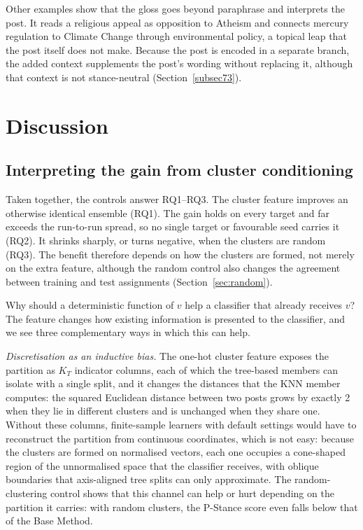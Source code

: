 \documentclass[pdflatex,sn-mathphys-num,iicol]{sn-jnl}%
\begin{document}
Other examples show that the gloss goes beyond paraphrase and interprets the post. It reads a religious appeal as opposition to Atheism and connects mercury regulation to Climate Change through environmental policy, a topical leap that the post itself does not make. Because the post is encoded in a separate branch, the added context supplements the post's wording without replacing it, although that context is not stance-neutral (Section~\ref{subsec73}).

\section{Discussion}\label{sec7}

\subsection{Interpreting the gain from cluster conditioning}\label{subsec71}

Taken together, the controls answer RQ1--RQ3. The cluster feature improves an otherwise identical ensemble (RQ1). The gain holds on every target and far exceeds the run-to-run spread, so no single target or favourable seed carries it (RQ2). It shrinks sharply, or turns negative, when the clusters are random (RQ3). The benefit therefore depends on how the clusters are formed, not merely on the extra feature, although the random control also changes the agreement between training and test assignments (Section~\ref{sec:random}).

Why should a deterministic function of \(v\) help a classifier that already receives \(v\)? The feature changes how existing information is presented to the classifier, and we see three complementary ways in which this can help.

\emph{Discretisation as an inductive bias.} The one-hot cluster feature exposes the partition as \(K_T\) indicator columns, each of which the tree-based members can isolate with a single split, and it changes the distances that the KNN member computes: the squared Euclidean distance between two posts grows by exactly 2 when they lie in different clusters and is unchanged when they share one. Without these columns, finite-sample learners with default settings would have to reconstruct the partition from continuous coordinates, which is not easy: because the clusters are formed on normalised vectors, each one occupies a cone-shaped region of the unnormalised space that the classifier receives, with oblique boundaries that axis-aligned tree splits can only approximate. The random-clustering control shows that this channel can help or hurt depending on the partition it carries: with random clusters, the P-Stance score even falls below that of the Base Method.
\end{document}
